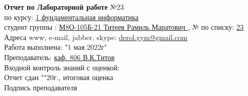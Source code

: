 \documentclass[10pt]{report}
\begin{document}
    \begin{spacing}{1.7}
        \hspace{1.2in}
        \textbf {Отчет по Лабораторной работе} №23\\     %
        \indent \hspace{1.2in} по курсу: \underline{1 фундаментальная информатика } \\
        \indent \hspace{1.2in} студент группы : \underline{М8О-105Б-21 Титеев Рамиль Маратович }, № по списку: \underline{ 23 } \\
        \indent \hspace{1.2in} Адреса www, e-mail, jabber, skype: \underline{ derol.gym@gmail.com } \\
        \indent \hspace{1.2in} Работа выполнена: "1 мая 2022г" \\   %
        \indent \hspace{1.2in} Преподаватель: \underline{ каф. 806 В.К.Титов} \\
        \indent \hspace{1.2in} Входной контроль знаний с оценкой: \tlinee{2in} \\
        \indent \hspace{1.2in} Отчет сдан "\tlinee{0.2in}"\tlinee{1in}20\tlinee{0.2in}г., итоговая оценка \tlinee{1in}\\
        \indent \hspace{1.2in} Подпись преподавателя \tlinee{1.2in}\\
    \end{spacing}
    
\end{document}
